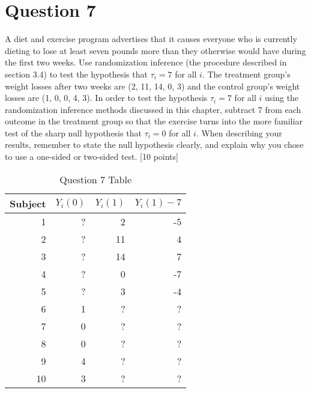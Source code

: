 \documentclass[11pt,notitlepage]{article}\usepackage[]{graphicx}\usepackage[]{color}
\begin{document}
\section*{Question 7}
A diet and exercise program advertises that it causes everyone who is currently dieting to lose at least seven pounds more than they otherwise would have during the first two weeks.  Use randomization inference (the procedure described in section 3.4) to test the hypothesis that $\tau_i=7$ for all $i$.  The treatment group's weight losses after two weeks are (2, 11, 14, 0, 3) and the control group's weight losses are (1, 0, 0, 4, 3).  In order to test the hypothesis $\tau_i=7$ for all $i$ using the randomization inference methods discussed in this chapter, subtract 7 from each outcome in the treatment group so that the exercise turns into the more familiar test of the sharp null hypothesis that $\tau_i=0$ for all $i$. When describing your results, remember to state the null hypothesis clearly, and explain why you chose to use a one-sided or two-sided test. [10 points]

\begin{table}[htbp]
  \centering
  \caption{Question 7 Table}
    \begin{tabular}{rrrr}
    \toprule
     Subject & $Y_i(0)$      & $Y_i(1)$       & $Y_i(1) - 7$  \\
    \midrule
    1     &   ?    &   2    &  -5 \\
    2     &   ?    &  11     &  4 \\
    3     &   ?    &  14     &  7 \\
    4     &   ?    &  0     &   -7\\
    5     &   ?    &  3     &   -4\\
    6     &   1    &  ?     &   ?\\
    7     &   0    &  ?     & ?  \\
    8     &   0    &  ?     & ?  \\
    9     &   4    &  ?     & ?  \\
    10    &   3    &  ?     & ? \\
    \bottomrule
    \end{tabular}%
  \label{tab:addlabel}%
\end{table}
\end{document}
